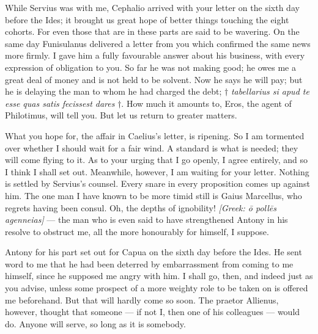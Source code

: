

 While Servius was with me, Cephalio arrived with your letter on the sixth day before the Ides; it brought us great hope of better things touching the eight cohorts. For even those that are in these parts are said to be wavering. On the same day Funisulanus delivered a letter from you which confirmed the same news more firmly. I gave him a fully favourable answer about his business, with every expression of obligation to you. So far he was not making good; he owes me a great deal of money and is not held to be solvent. Now he says he will pay; but he is delaying the man to whom he had charged the debt; $\dagger$ \textit{tabellarius si apud te esse quas satis fecissest dares} $\dagger$. How much it amounts to, Eros, the agent of Philotimus, will tell you. But let us return to greater matters.

 What you hope for, the affair in Caelius's letter, is ripening. So I am tormented over whether I should wait for a fair wind. A standard is what is needed; they will come flying to it. As to your urging that I go openly, I agree entirely, and so I think I shall set out. Meanwhile, however, I am waiting for your letter. Nothing is settled by Servius's counsel. Every snare in every proposition comes up against him. The one man I have known to be more timid still is Gaius Marcellus, who regrets having been consul. Oh, the depths of ignobility! \textit{[Greek: \=o poll\=es agenneias]} --- the man who is even said to have strengthened Antony in his resolve to obstruct me, all the more honourably for himself, I suppose.

 Antony for his part set out for Capua on the sixth day before the Ides. He sent word to me that he had been deterred by embarrassment from coming to me himself, since he supposed me angry with him. I shall go, then, and indeed just as you advise, unless some prospect of a more weighty role to be taken on is offered me beforehand. But that will hardly come so soon. The praetor Allienus, however, thought that someone --- if not I, then one of his colleagues --- would do. Anyone will serve, so long as it is somebody.

